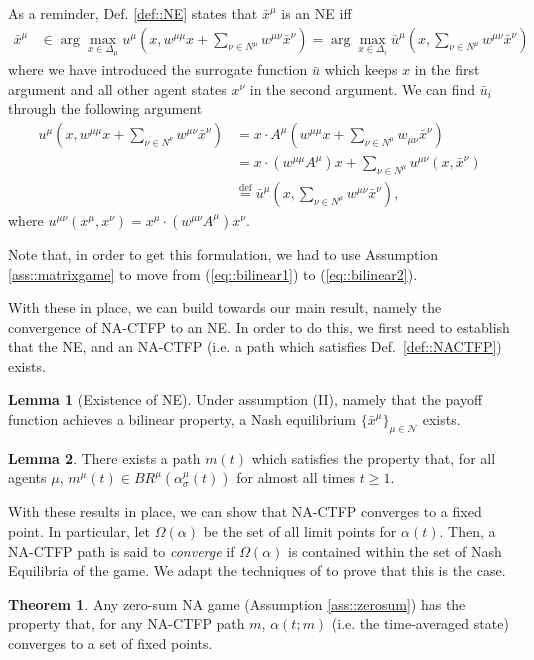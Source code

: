 \documentclass{article}
\theoremstyle{definition}
\newtheorem{theorem}{Theorem}
\newtheorem{lemma}{Lemma}
\newcommand{\agentset}{\mathcal{N}}
\newcommand{\xmu}{x^{\mu}}
\newcommand{\xnu}{x^{\nu}}
\newcommand{\NE}[1]{\bar{x}^{#1}}
\begin{document}
  As a reminder,
  Def. \ref{def::NE} states that $\NE{\mu}$ is an NE iff
%
  \begin{align*}
    \NE{\mu} &\in \arg\max_{x \in \Delta_\mu} u^\mu(x, w^{\mu \mu}x + \sum_{\nu \in N^\mu} w^{\mu \nu} \NE{\nu}) \nonumber  = \arg\max_{x \in \Delta_i} \bar{u}^\mu(x, \sum_{\nu \in N^\mu} w^{\mu \nu} \NE{\nu})
  \end{align*}
%
  where we have introduced the surrogate function $\bar{u}$ which keeps $x$ in the first argument and all other agent states $\xnu$ in the second argument. We can find $\bar{u}_i$ through the following argument
%  
  \begin{align}
    u^\mu(x, w^{\mu \mu} x + \sum_{\nu \in N^\nu} w^{\mu \nu} \NE{\nu}) & = x \cdot A^\mu (w^{\mu \mu} x + \sum_{\nu \in N^\mu} w_{\mu \nu} \NE{\nu}) \label{eq::bilinear1}\\
     & = x \cdot (w^{\mu \mu} A^\mu)  x + \sum_{\nu \in N^\mu} u^{\mu \nu}(x, \NE{\nu}) \label{eq::bilinear2} \\
     & \stackrel{\text{def}}{=} \bar{u}^\mu(x, \sum_{\nu \in N^\mu} w^{\mu \nu} \NE{\nu}), \nonumber
  \end{align}
%  
  where $u^{\mu \nu}(\xmu, x^\nu) = \xmu \cdot (w^{\mu \nu}A^\mu) x^\nu$.

  Note that, in order to get this formulation, we had to use Assumption \ref{ass::matrixgame}
 to move from (\ref{eq::bilinear1}) to (\ref{eq::bilinear2}).

  With these in place, we can build towards our main result, namely
  the convergence of NA-CTFP to an NE. In order to do this, we first
  need to establish that the NE, and an NA-CTFP (i.e. a path which
  satisfies Def.~\ref{def::NACTFP}) exists.
  
  \begin{lemma}[Existence of NE]
    Under assumption (II), namely that the payoff function achieves a bilinear property, a
    Nash equilibrium $\{\bar{x}^\mu\}_{\mu \in \agentset}$ exists.
  \end{lemma}

  \begin{lemma}
    There exists a path $m(t)$ which satisfies the property that, for all agents $\mu$, $m^\mu(t) \in
    BR^\mu(\alpha_\sigma^\mu(t))$ for almost all times $t \geq 1$.
  \end{lemma}

With these results in place, we can show that NA-CTFP converges
to a fixed point. In particular, let $\Omega(\alpha)$ be the set of
all limit points for $\alpha(t)$. Then, a NA-CTFP path is said to {\em 
converge} if $\Omega(\alpha)$ is contained within the set of Nash
Equilibria of the game. We adapt the techniques
of \cite{Ewerhart2020} to prove that this is the case.
%
  \begin{theorem} \label{thm::NACTFPtoFixed}
    Any zero-sum NA game (Assumption \ref{ass::zerosum}) has the property that, for any NA-CTFP path $m$, $\alpha(t; m)$ (i.e. the time-averaged state) converges to a set of fixed points.
  \end{theorem}
\end{document}
